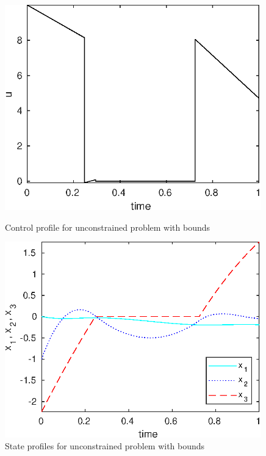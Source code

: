 \begin{figure}[htb]
\begin{minipage}[t]{0.5\linewidth}
\centering
\includegraphics[width=0.99\textwidth,clip]{examples/problem2/graphs/u_624a.eps}
\caption[Tutorial example 3: control profile]{Control profile for
  unconstrained problem with bounds} \label{fig:prob2_u} 
\end{minipage}
\begin{minipage}[t]{0.5\linewidth}
\centering
\includegraphics[width=0.99\textwidth,clip]{examples/problem2/graphs/x13_624a.eps}
\caption[Tutorial example 3: state profiles]{State profiles for
  unconstrained problem with bounds} \label{fig:prob2_x}
\end{minipage}
\end{figure}

